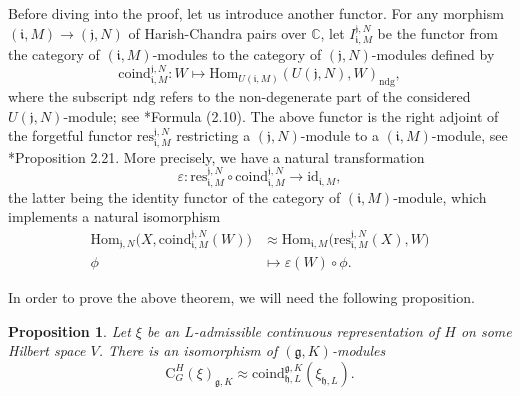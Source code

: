 \documentclass{amsart}
\newtheorem{proposition}[theorem]{Proposition}
\theoremstyle{definition}
\begin{document}
Before diving into the proof, let us introduce another functor. For any morphism $(\mathfrak{i},M) \to (\mathfrak{j},N)$ of Harish-Chandra pairs over $\mathbb{C}$, let $I^{\mathfrak{j},N}_{\mathfrak{i},M}$ be the functor from the category of $(\mathfrak{i},M)$-modules to the category of $(\mathfrak{j},N)$-modules defined by
\[\text{coind}^{\mathfrak{j},N}_{\mathfrak{i},M}: W \longmapsto \mathrm{Hom}_{U(\mathfrak{i},M)}(U(\mathfrak{j},N), W)_\mathrm{ndg},\]
where the subscript $\mathrm{ndg}$ refers to the non-degenerate part of the considered $U(\mathfrak{j},N)$-module; see \cite{KnappVogan}*{Formula (2.10)}.
The above functor is the right adjoint of the forgetful functor $\mathrm{res}^{\mathfrak{j},N}_{\mathfrak{i},M}$ restricting a $(\mathfrak{j},N)$-module to a $(\mathfrak{i},M)$-module, see \cite{KnappVogan}*{Proposition 2.21}. More precisely, we have a natural transformation \[\varepsilon : \mathrm{res}^{\mathfrak{j},N}_{\mathfrak{i},M}\circ \text{coind}^{\mathfrak{j},N}_{\mathfrak{i},M} \to \mathrm{id}_{\mathfrak{i},M},\]
the latter being the identity functor of the category of $(\mathfrak{i},M)$-module, which implements a natural isomorphism
\begin{equation}\label{Frobenius}\begin{aligned}\mathrm{Hom}_{\mathfrak{j},N}\big(X, \text{coind}^{\mathfrak{j},N}_{\mathfrak{i},M}(W)\big) &\approx \mathrm{Hom}_{\mathfrak{i},M}\big(\mathrm{res}^{\mathfrak{j},N}_{\mathfrak{i},M}(X), W\big)\\
\phi& \mapsto \varepsilon(W) \circ \phi.\end{aligned} 
\end{equation}

In order to prove the above theorem, we will need the following proposition.

\begin{proposition}\label{intermediateComparison}
    Let $\xi$ be an $L$-admissible continuous representation of $H$ on some Hilbert space $V$. There is an isomorphism of $(\mathfrak{g},K)$-modules
    \[\mathrm{C}_G^H(\xi)_{\mathfrak{g},K} \approx \mathrm{coind}_{\mathfrak{h},L}^{\mathfrak{g},K}(\xi_{\mathfrak{h},L}).\]
\end{proposition}
\end{document}
